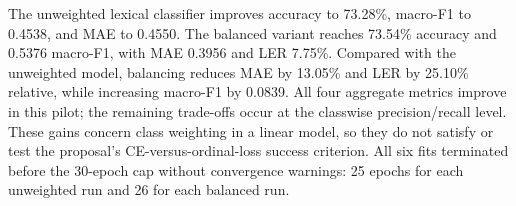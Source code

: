 The unweighted lexical classifier improves accuracy to 73.28\%, macro-F1 to 0.4538, and MAE to 0.4550. The balanced variant reaches 73.54\% accuracy and 0.5376 macro-F1, with MAE 0.3956 and LER 7.75\%. Compared with the unweighted model, balancing reduces MAE by 13.05\% and LER by 25.10\% relative, while increasing macro-F1 by 0.0839. All four aggregate metrics improve in this pilot; the remaining trade-offs occur at the classwise precision/recall level. These gains concern class weighting in a linear model, so they do not satisfy or test the proposal's CE-versus-ordinal-loss success criterion. All six fits terminated before the 30-epoch cap without convergence warnings: 25 epochs for each unweighted run and 26 for each balanced run.
